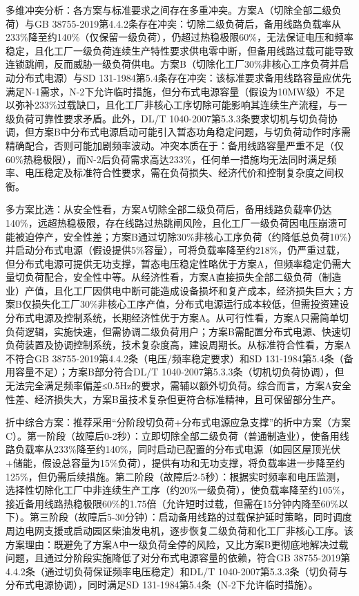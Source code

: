 \documentclass[12pt,a4paper]{ctexart}
\begin{document}
\begin{description}[leftmargin=1.5em,style=nextline,font=\normalfont]
多维冲突分析：各方案与标准要求之间存在多重冲突。方案A（切除全部二级负荷）与GB 38755-2019第4.4.2条存在冲突：切除二级负荷后，备用线路负载率从233\%降至约140\%（仅保留一级负荷），仍超过热稳极限60\%，无法保证电压和频率稳定，且化工厂一级负荷连续生产特性要求供电零中断，但备用线路过载可能导致连锁跳闸，反而威胁一级负荷供电。方案B（切除化工厂30\%非核心工序负荷并启动分布式电源）与SD 131-1984第5.4条存在冲突：该标准要求备用线路容量应优先满足N-1需求，N-2下允许临时措施，但分布式电源容量（假设为10MW级）不足以弥补233\%过载缺口，且化工厂非核心工序切除可能影响其连续生产流程，与一级负荷可靠性要求矛盾。此外，DL/T 1040-2007第5.3.3条要求切机与切负荷协调，但方案B中分布式电源启动可能引入暂态功角稳定问题，与切负荷动作时序需精确配合，否则可能加剧频率波动。冲突本质在于：备用线路容量严重不足（仅60\%热稳极限），而N-2后负荷需求高达233\%，任何单一措施均无法同时满足频率、电压稳定及标准符合性要求，需在负荷损失、经济代价和控制复杂度之间权衡。

多方案比选：从安全性看，方案A切除全部二级负荷后，备用线路负载率仍达140\%，远超热稳极限，存在线路过热跳闸风险，且化工厂一级负荷因电压崩溃可能被迫停产，安全性差；方案B通过切除30\%非核心工序负荷（约降低总负荷10\%）并启动分布式电源（假设提供5\%容量），可将负载率降至约218\%，仍严重过载，但分布式电源可提供无功支撑，暂态电压稳定性略优于方案A，但频率稳定仍需大量切负荷配合，安全性中等。从经济性看，方案A直接损失全部二级负荷（制造业）产值，且化工厂因供电中断可能造成设备损坏和复产成本，经济损失巨大；方案B仅损失化工厂30\%非核心工序产值，分布式电源运行成本较低，但需投资建设分布式电源及控制系统，长期经济性优于方案A。从可行性看，方案A只需简单切负荷逻辑，实施快速，但需协调二级负荷用户；方案B需配置分布式电源、快速切负荷装置及协调控制系统，技术复杂度高，建设周期长。从标准符合性看，方案A不符合GB 38755-2019第4.4.2条（电压/频率稳定要求）和SD 131-1984第5.4条（备用容量不足）；方案B部分符合DL/T 1040-2007第5.3.3条（切机切负荷协调），但无法完全满足频率偏差≤0.5Hz的要求，需辅以额外切负荷。综合而言，方案A安全性差、经济损失大，方案B虽技术复杂但更符合标准精神，且可保留部分生产。

折中综合方案：推荐采用“分阶段切负荷+分布式电源应急支撑”的折中方案（方案C）。第一阶段（故障后0-2秒）：立即切除全部二级负荷（普通制造业），使备用线路负载率从233\%降至约140\%，同时启动已配置的分布式电源（如园区屋顶光伏+储能，假设总容量为15\%负荷），提供有功和无功支撑，将负载率进一步降至约125\%，但仍需后续措施。第二阶段（故障后2-5秒）：根据实时频率和电压监测，选择性切除化工厂中非连续生产工序（约20\%一级负荷），使负载率降至约105\%，接近备用线路热稳极限60\%的1.75倍（允许短时过载，但需在15分钟内降至60\%以下）。第三阶段（故障后5-30分钟）：启动备用线路的过载保护延时策略，同时调度周边电网支援或启动园区柴油发电机，逐步恢复二级负荷和化工厂非核心工序。该方案理由：既避免了方案A中一级负荷全停的风险，又比方案B更彻底地解决过载问题，且通过分阶段实施降低了对分布式电源容量的依赖，符合GB 38755-2019第4.4.2条（通过切负荷保证频率电压稳定）和DL/T 1040-2007第5.3.3条（切负荷与分布式电源协调），同时满足SD 131-1984第5.4条（N-2下允许临时措施）。


\end{description}
\end{document}
